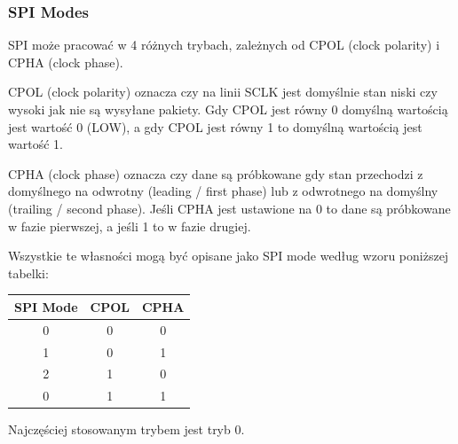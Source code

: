 \documentclass[11pt]{article}
\begin{document}
\subsubsection{SPI Modes}
SPI może pracować w 4 różnych trybach, zależnych od CPOL (clock polarity) i
CPHA (clock phase).

CPOL (clock polarity) oznacza czy na linii SCLK jest domyślnie stan niski czy wysoki
jak nie są wysyłane pakiety. Gdy CPOL jest równy 0 domyślną wartością jest wartość 0 (LOW),
a gdy CPOL jest równy 1 to domyślną wartością jest wartość 1.

CPHA (clock phase) oznacza czy dane są próbkowane gdy stan przechodzi z domyślnego na odwrotny (leading / first phase)
lub z odwrotnego na domyślny (trailing / second phase). Jeśli CPHA jest ustawione na 0 to dane
są próbkowane w fazie pierwszej, a jeśli 1 to w fazie drugiej.

Wszystkie te własności mogą być opisane jako SPI mode według wzoru poniższej tabelki:
\begin{table}[H]
    \centering
    \begin{tabular}{|c|c|c|}
        \hline
        SPI Mode & CPOL & CPHA \\
        \hline
        0 & 0 & 0 \\ \hline
        1 & 0 & 1 \\ \hline
        2 & 1 & 0 \\ \hline 
        0 & 1 & 1 \\
        \hline
    \end{tabular}
\end{table}
Najczęściej stosowanym trybem jest tryb 0.
\end{document}
